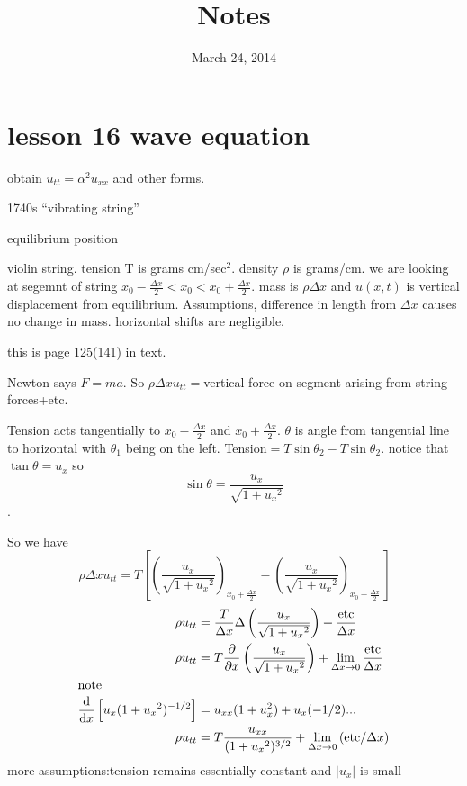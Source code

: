 \documentclass{article}
\begin{document}
\title{Notes}
\date{March 24, 2014}
\maketitle
\section*{lesson 16 wave equation}
obtain $u_{tt}=\alpha^2 u_{xx}$ and other forms.

1740s ``vibrating string''

equilibrium position

violin string. tension T is grams cm/sec$^2$. density $\rho$ is grams/cm. we are looking at segemnt of string $x_0-\frac{\Delta x}{2}<x_0<x_0+\frac{\Delta x}{2}$. mass is $\rho\Delta x$ and $u(x,t)$ is vertical displacement from equilibrium. Assumptions, difference in length from $\Delta x$ causes no change in mass. horizontal shifts are negligible.

this is page 125(141) in text.

Newton says $F=ma$. So $\rho\Delta xu_{tt}=$vertical force on segment arising from string forces+etc.

Tension acts tangentially to $x_0-\frac{\Delta x}{2}$ and $x_0+\frac{\Delta x}{2}$. $\theta$ is angle from tangential line to horizontal with $\theta_1$ being on the left. Tension$=T\sin \theta_2-T\sin\theta_2$. notice that $\tan\theta=u_x$ so \[\sin\theta=\frac{u_x}{\sqrt{1+{u_x}^2}}\].

So we have
\[\rho\Delta xu_{tt}=T\left[\left(\frac{u_x}{\sqrt{1+{u_x}^2}}\right)_{x_0+\frac{\Delta x}{2}}-\left(\frac{u_x}{\sqrt{1+{u_x}^2}}\right)_{x_0-\frac{\Delta x}{2}}\right]\]
\begin{align*}
  \rho u_{tt}&=\frac{T}{\Delta x}\Delta\left(\frac{u_x}{\sqrt{1+{u_x}^2}}\right)+\frac{\text{etc}}{\Delta x}\\
  \rho u_{tt}&=T\frac{\partial }{\partial x}\left(\frac{u_x}{\sqrt{1+{u_x}^2}}\right)+\lim\limits_{\Delta x\to0}\frac{\text{etc}}{\Delta x}\\
  \intertext{note}
  \frac{\mathrm{d}}{\mathrm{d}x}\left[u_x(1+{u_x}^2)^{-1/2}\right]&=u_{xx}(1+u_x^2)+u_x(-1/2)...\\
  \rho u_{tt}&=T\frac{u_{xx}}{(1+{u_x}^2)^{3/2}}+\lim_{\Delta x\to0}\left(\text{etc}/\Delta x\right)
\end{align*}
more assumptions:tension remains essentially constant and $\left\lvert u_x\right\rvert$ is small
\end{document}
